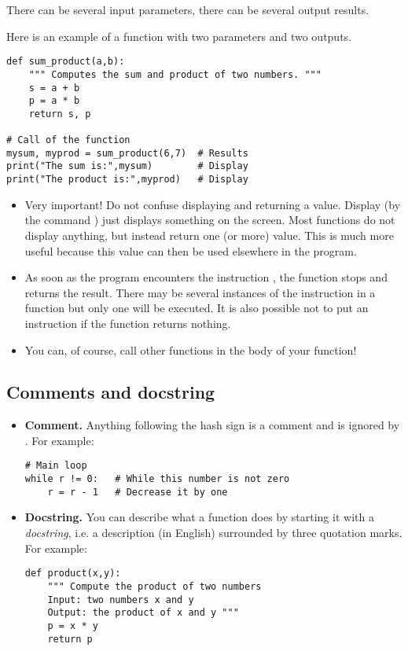 \documentclass[11pt,class=report,crop=false]{standalone}
\begin{document}
There can be several input parameters, there can be several output results.
  


Here is an example of a function with two parameters and two outputs.
\begin{lstlisting}
def sum_product(a,b):
    """ Computes the sum and product of two numbers. """
    s = a + b
    p = a * b
    return s, p

# Call of the function
mysum, myprod = sum_product(6,7)  # Results
print("The sum is:",mysum)        # Display
print("The product is:",myprod)   # Display
\end{lstlisting}

\begin{itemize}
  
  \item Very important! Do not confuse displaying and returning a value.
  Display (by the command ) just displays something on the screen. Most functions do not display anything, but instead return one (or more) value. This is much more useful because this value can then be used elsewhere in the program.
  
  \item As soon as the program encounters the instruction , the function stops and returns the result. There may be several instances of the  instruction in a function but only one will be executed. It is also possible not to put an instruction  if the function returns nothing.
  
  \item You can, of course, call other functions in the body of your function!

\end{itemize}

\subsection{Comments and docstring}

\begin{itemize}
  \item \textbf{Comment.} Anything following the hash sign \ci{#} is a comment and is ignored by \Python. 
  For example:
\begin{lstlisting}
# Main loop
while r != 0:   # While this number is not zero
    r = r - 1   # Decrease it by one
\end{lstlisting}
  
  \item \textbf{Docstring.} You can describe what a function does by starting it with a \emph{docstring}, i.e. a description (in English) surrounded by three quotation marks.  
 For example:
\begin{lstlisting}
def product(x,y):
    """ Compute the product of two numbers
    Input: two numbers x and y
    Output: the product of x and y """
    p = x * y
    return p 
\end{lstlisting} 

\end{itemize}
\end{document}
